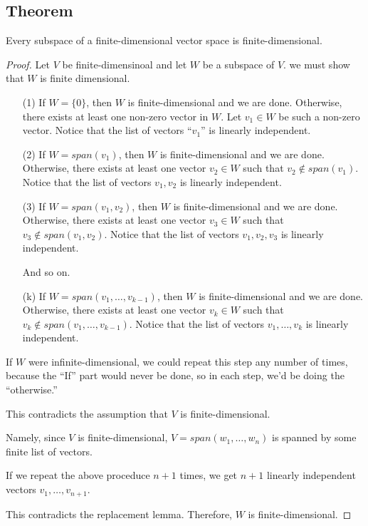 \documentclass[11pt]{article}
\begin{document}
    \subsection{Theorem}

    Every subspace of a finite-dimensional vector space is finite-dimensional.

    \begin{proof}
        Let $V$ be finite-dimensinoal and let $W$ be a subspace of $V$. we must show that $W$ is finite dimensional.
        \begin{enumerate}
            \item[(1)] If \(W = \{0\}\), then $W$ is finite-dimensional and we are done. Otherwise, there exists at least one non-zero vector in $W$. Let \(v_1 \in W\) be such a non-zero vector. Notice that the list of vectors ``\(v_1\)'' is linearly independent.
            \item[(2)] If \(W = span(v_1)\), then $W$ is finite-dimensional and we are done. Otherwise, there exists at least one vector \(v_2 \in W\) such that \(v_2 \notin span(v_1)\). Notice that the list of vectors \(v_1, v_2\) is linearly independent.
            \item[(3)] If \(W = span(v_1,v_2)\), then $W$ is finite-dimensional and we are done. Otherwise, there exists at least one vector \(v_3 \in W\) such that \(v_3 \notin span(v_1,v_2)\). Notice that the list of vectors \(v_1, v_2, v_3\) is linearly independent.
            
            And so on.

            \item[(k)] If \(W = span(v_1, \dots, v_{k-1})\), then $W$ is finite-dimensional and we are done. Otherwise, there exists at least one vector \(v_k \in W\) such that \(v_k \notin span(v_1, \dots, v_{k-1})\). Notice that the list of vectors \(v_1, \dots, v_k\) is linearly independent.  
        \end{enumerate}

        If $W$ were infinite-dimensional, we could repeat this step any number of times, because the ``If'' part would never be done, so in each step, we'd be doing the ``otherwise.''

        This contradicts the assumption that $V$ is finite-dimensional.

        Namely, since $V$ is finite-dimensional, \(V = span(w_1, \dots, w_n)\) is spanned by some finite list of vectors.

        If we repeat the above proceduce \(n+1\) times, we get \(n+1\) linearly independent vectors \(v_1, \dots, v_{n+1}\).

        This contradicts the replacement lemma. Therefore, $W$ is finite-dimensional.
    \end{proof}
    
\end{document}
